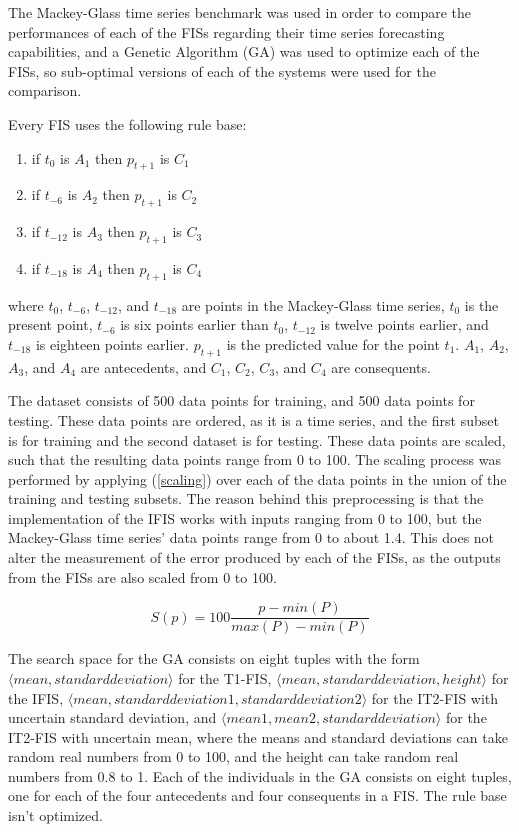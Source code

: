 \documentclass[conference]{IEEEtran}
\begin{document}
The Mackey-Glass time series benchmark was used in order to compare
the performances of each of the FISs regarding their time series
forecasting capabilities, and a Genetic Algorithm (GA) was
used to optimize each of the FISs, so sub-optimal versions of each of
the systems were used for the comparison.

Every FIS uses the following rule base:

\begin{enumerate}
  \item if $t_{0}$ is $A_{1}$ then $p_{t+1}$ is $C_{1}$
  \item if $t_{-6}$ is $A_{2}$ then $p_{t+1}$ is $C_{2}$
  \item if $t_{-12}$ is $A_{3}$ then $p_{t+1}$ is $C_{3}$
  \item if $t_{-18}$ is $A_{4}$ then $p_{t+1}$ is $C_{4}$
\end{enumerate}
where $t_{0}$, $t_{-6}$, $t_{-12}$, and $t_{-18}$ are points in the
Mackey-Glass time series, $t_{0}$ is the present point, $t_{-6}$ is six
points earlier than $t_{0}$, $t_{-12}$ is twelve points earlier, and
$t_{-18}$ is eighteen points earlier. $p_{t+1}$ is the predicted value
for the point $t_{1}$. $A_{1}$, $A_{2}$, $A_{3}$, and $A_{4}$ are
antecedents, and $C_{1}$, $C_{2}$, $C_{3}$, and $C_{4}$ are
consequents.

The dataset consists of 500 data points for training, and 500 data
points for testing. These data points are ordered, as it is a time
series, and the first subset is for training and the second dataset is
for testing. These data points are scaled, such that the
resulting data points range from 0 to 100. The scaling process was
performed by applying (\ref{scaling}) over each of the data points in
the union of the training and testing subsets. The reason behind this
preprocessing is that the implementation of the IFIS works with inputs
ranging from 0 to 100, but the Mackey-Glass time series' data points
range from 0 to about 1.4. This does not alter the measurement of the
error produced by each of the FISs, as the outputs from the FISs are
also scaled from 0 to 100.

\begin{equation}
  \label{scaling}
  S(p) = 100 \frac{p - min(P)}{max(P) - min(P)}
\end{equation}

The search space for the GA consists on eight tuples with the form $\langle
mean, standard deviation \rangle$ for the T1-FIS, $\langle
mean, standard deviation, height \rangle$ for the IFIS, $\langle
mean, standard deviation 1, standard deviation 2 \rangle$ for the
IT2-FIS with uncertain standard deviation, and $\langle
mean 1, mean 2, standard deviation \rangle$ for the IT2-FIS with
uncertain mean, where the means and standard deviations can take
random real numbers from 0 to 100, and the height can take random real
numbers from 0.8 to 1. Each of the individuals in the GA consists on
eight tuples, one for each of the four antecedents and four
consequents in a FIS. The rule base isn't optimized.
\end{document}
